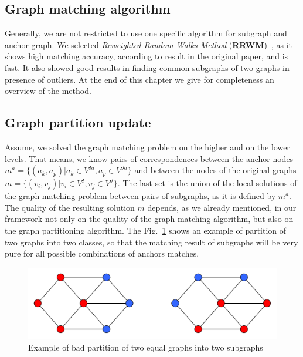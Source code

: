 \subsection{Graph matching algorithm}
Generally, we are not restricted to use one specific algorithm for subgraph and anchor graph. We selected \emph{Reweighted Random Walks Method} (\textbf{RRWM})~\cite{Cho2010_RRWM}, as it shows high matching accuracy, according to result in the original paper, and is fast. It also showed good results in finding common subgraphs of two graphs in presence of outliers. At the end of this chapter we give for completeness an overview of the method.

\subsection{Graph partition update}
Assume, we solved the graph matching problem on the higher and on the lower levels. That means, we know pairs of correspondences between the anchor nodes $m^a = \{(a_k, a_p)|a_k\in V^{Ia}, a_p\in V^{Ja}\}$ and between the nodes of the original graphs $m = \{(v_i, v_j)|v_i\in V^{I}, v_j\in V^{J}\}$. The last set is the union of the local solutions of the graph matching problem between pairs of subgraphs, as it is defined by $m^a$.
The quality of the resulting solution $m$ depends, as we already mentioned, in our framework not only on the quality of the graph matching algorithm, but also on the graph partitioning algorithm.
The Fig.~\ref{fig:badpartition} shows an example of partition of two graphs into two classes, so that the matching result of subgraphs will be very pure for all possible combinations of anchors matches.

\begin{figure}[h]
	\centering
	\includegraphics[scale=0.35]{chapter2/fig/badpartition.pdf}
	\caption{Example of bad partition of two equal graphs into two subgraphs} \label{fig:badpartition}
\end{figure}

